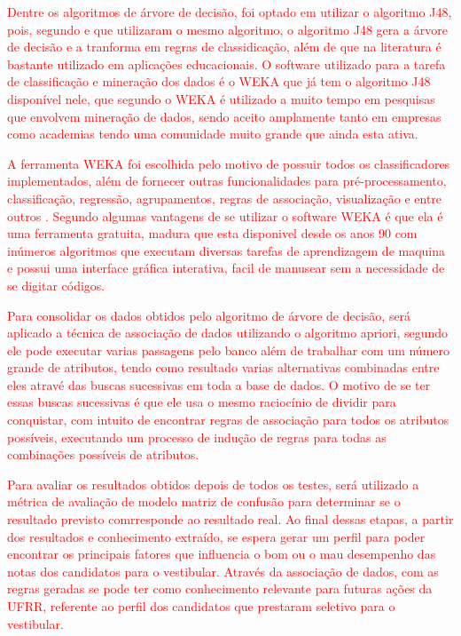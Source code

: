 \par
\textcolor{red}{Dentre os algoritmos de árvore de decisão, foi optado em utilizar o algoritmo J48, pois, segundo  e  que utilizaram o mesmo algoritmo, o algoritmo J48 gera a árvore de decisão e a tranforma em regras de classidicação, além de que na literatura é bastante utilizado em aplicações educacionais. O software utilizado para a tarefa de classificação e mineração dos dados é o WEKA que já tem o algoritmo J48 disponível nele, que segundo  o WEKA é utilizado a muito tempo em pesquisas que envolvem mineração de dados, sendo aceito amplamente tanto em empresas como academias tendo uma comunidade muito grande que ainda esta ativa.}

\par
\textcolor{red}{A ferramenta WEKA foi escolhida pelo motivo de possuir todos os classificadores implementados, além de fornecer outras funcionalidades para pré-processamento, classificação, regressão, agrupamentos, regras de associação, visualização e entre outros \cite{Camilo2009}. Segundo  algumas vantagens de se utilizar o software WEKA é que ela é uma ferramenta gratuita, madura que esta disponivel desde os anos 90 com inúmeros algoritmos que executam diversas tarefas de aprendizagem de maquina e possui uma interface gráfica interativa, facil de manusear sem a necessidade de se digitar códigos.} 

\par
\textcolor{red}{Para consolidar os dados obtidos pelo algoritmo de árvore de decisão, será aplicado a técnica de associação de dados utilizando o algoritmo apriori, segundo  ele pode executar varias passagens pelo banco além de trabalhar com um número grande de atributos, tendo como resultado varias alternativas combinadas entre eles atravé das buscas sucessivas em toda a base de dados. O motivo de se ter essas buscas sucessivas é que ele usa o mesmo raciocínio de dividir para conquistar, com intuito de encontrar regras de associação para todos os atributos possíveis, executando um processo de indução de regras para todas as combinações possíveis de atributos.}

\par
\textcolor{red}{Para avaliar os resultados obtidos depois de todos os testes, será utilizado a métrica de avaliação de modelo matriz de confusão para determinar se o resultado previsto comrresponde ao resultado real. Ao final dessas etapas, a partir dos resultados e conhecimento extraído, se espera gerar um perfil para poder encontrar os principais fatores que influencia o bom ou o mau desempenho das notas dos candidatos para o vestibular. Através da associação de dados, com as regras geradas se pode ter como conhecimento relevante para futuras ações da UFRR, referente ao perfil dos candidatos que prestaram seletivo para o vestibular.}

